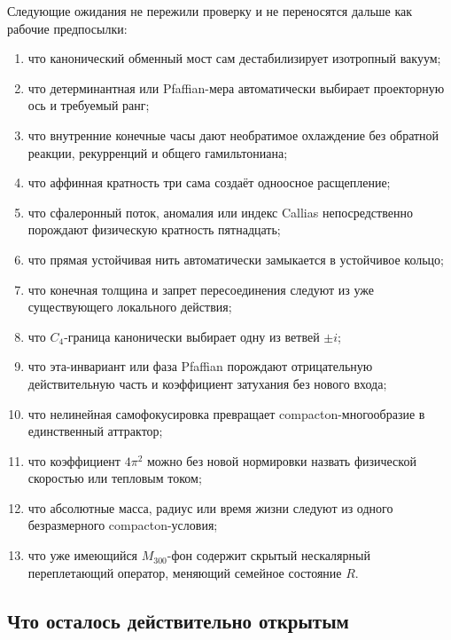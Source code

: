 Следующие ожидания не пережили проверку и не переносятся дальше как
рабочие предпосылки:
\begin{enumerate}
 \item что канонический обменный мост сам дестабилизирует изотропный
 вакуум;
 \item что детерминантная или Pfaffian-мера автоматически выбирает
 проекторную ось и требуемый ранг;
 \item что внутренние конечные часы дают необратимое охлаждение без
 обратной реакции, рекурренций и общего гамильтониана;
 \item что аффинная кратность три сама создаёт одноосное расщепление;
 \item что сфалеронный поток, аномалия или индекс Callias непосредственно
 порождают физическую кратность пятнадцать;
 \item что прямая устойчивая нить автоматически замыкается в устойчивое
 кольцо;
 \item что конечная толщина и запрет пересоединения следуют из уже
 существующего локального действия;
 \item что $C_4$-граница канонически выбирает одну из ветвей $\pm i$;
 \item что эта-инвариант или фаза Pfaffian порождают отрицательную
 действительную часть и коэффициент затухания без нового входа;
 \item что нелинейная самофокусировка превращает compacton-многообразие в
 единственный аттрактор;
 \item что коэффициент $4\pi^2$ можно без новой нормировки назвать
 физической скоростью или тепловым током;
 \item что абсолютные масса, радиус или время жизни следуют из одного
 безразмерного compacton-условия;
 \item что уже имеющийся $M_{300}$-фон содержит скрытый нескалярный
 переплетающий оператор, меняющий семейное состояние $R$.
\end{enumerate}

\subsection{Что осталось действительно открытым}

